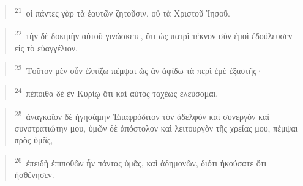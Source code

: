 \documentclass{article}
\newcommand{\currentverse}{1} %
\newcommand{\setcurrentverse}[1]{\renewcommand{\currentverse}{#1}}
\begin{document}
\begin{verse}

\setcurrentverse{21}

\setcounter{footnote}{0}

\textsuperscript{21}~οἱ πάντες γὰρ τὰ ἑαυτῶν ζητοῦσιν, οὐ τὰ Χριστοῦ Ἰησοῦ.

\end{verse}

\begin{verse}

\setcurrentverse{22}

\setcounter{footnote}{0}

\textsuperscript{22}~τὴν δὲ δοκιμὴν αὐτοῦ γινώσκετε, ὅτι ὡς πατρὶ τέκνον σὺν ἐμοὶ ἐδούλευσεν εἰς τὸ εὐαγγέλιον.

\end{verse}

\begin{verse}

\setcurrentverse{23}

\setcounter{footnote}{0}

\textsuperscript{23}~Τοῦτον μὲν οὖν ἐλπίζω πέμψαι ὡς ἂν ἀφίδω τὰ περὶ ἐμὲ ἐξαυτῆς·

\end{verse}

\begin{verse}

\setcurrentverse{24}

\setcounter{footnote}{0}

\textsuperscript{24}~πέποιθα δὲ ἐν Κυρίῳ ὅτι καὶ αὐτὸς ταχέως ἐλεύσομαι.

\end{verse}

\begin{verse}

\setcurrentverse{25}

\setcounter{footnote}{0}

\textsuperscript{25}~ἀναγκαῖον δὲ ἡγησάμην Ἐπαφρόδιτον τὸν ἀδελφὸν καὶ συνεργὸν καὶ συνστρατιώτην μου, ὑμῶν δὲ ἀπόστολον καὶ λειτουργὸν τῆς χρείας μου, πέμψαι πρὸς ὑμᾶς,

\end{verse}

\begin{verse}

\setcurrentverse{26}

\setcounter{footnote}{0}

\textsuperscript{26}~ἐπειδὴ ἐπιποθῶν ἦν πάντας ὑμᾶς, καὶ ἀδημονῶν, διότι ἠκούσατε ὅτι ἠσθένησεν.

\end{verse}
\end{document}
